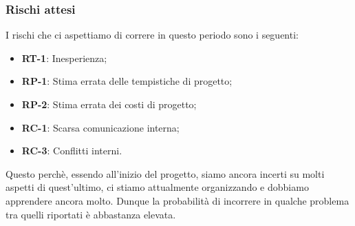 \documentclass[8pt]{article}
\begin{document}
\subsubsection{Rischi attesi}
I rischi che ci aspettiamo di correre in questo periodo sono i seguenti: 
\begin{itemize}
\setlength{\itemsep}{0em}
\item \textbf{RT-1}: Inesperienza;
\item \textbf{RP-1}: Stima errata delle tempistiche di progetto;
\item \textbf{RP-2}: Stima errata dei costi di progetto;
\item \textbf{RC-1}: Scarsa comunicazione interna;
\item \textbf{RC-3}: Conflitti interni.
\end{itemize}
Questo perchè, essendo all'inizio del progetto, siamo ancora incerti su molti aspetti di
quest'ultimo, ci stiamo attualmente organizzando e dobbiamo apprendere ancora molto. Dunque la
probabilità di incorrere in qualche problema tra quelli riportati è abbastanza elevata.
\newpage
\end{document}
